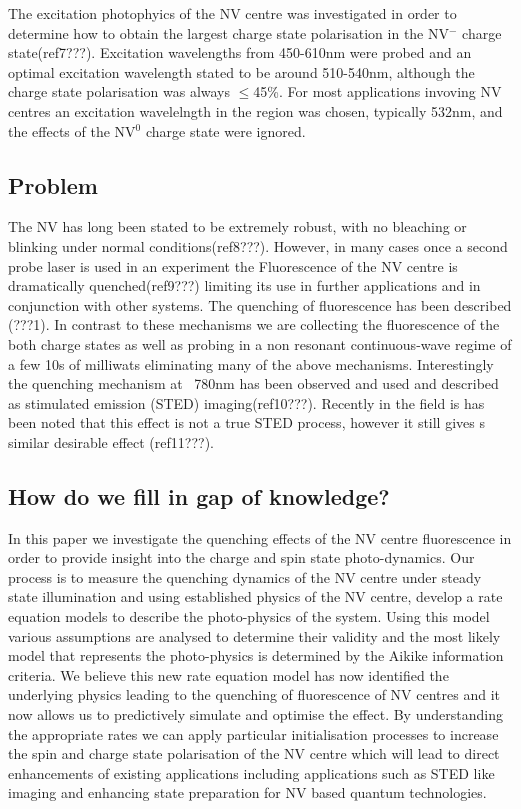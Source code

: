 \documentclass[preprint,prl]{revtex4}
\begin{document}
The excitation photophyics of the NV centre was investigated in order to determine how to obtain the largest charge state polarisation in the NV$^-$ charge state(ref7???). Excitation wavelengths from 450-610nm were probed and an optimal excitation wavelength stated to be around 510-540nm, although the charge state polarisation was always $\leq$45\%. For most applications invoving NV centres an excitation wavelelngth in the region was chosen, typically 532nm, and the effects of the NV$^0$ charge state were ignored.

\subsection{Problem}

The NV has long been stated to be extremely robust, with no bleaching or blinking under normal conditions(ref8???). However, in many cases once a second probe laser is used in an experiment the Fluorescence of the NV centre is dramatically quenched(ref9???) limiting its use in further applications and in conjunction with other systems. The quenching of fluorescence has been described (???1). In contrast to these mechanisms we are collecting the fluorescence of the both charge states as well as probing in a non resonant continuous-wave regime of a few 10s of milliwats eliminating many of the above mechanisms. Interestingly the quenching mechanism at ~780nm has been observed and used and described as stimulated emission (STED) imaging(ref10???). Recently in the field is has been noted that this effect is not a true STED process, however it still gives s similar desirable effect (ref11???).  

\subsection{How do we fill in gap of knowledge?}

In this paper we investigate the quenching effects of the NV centre fluorescence in order to provide insight into the charge and spin state photo-dynamics. Our process is to measure the quenching dynamics of the NV centre under steady state illumination and using established physics of the NV centre, develop a rate equation models to describe the photo-physics of the system. Using this model various assumptions are analysed to determine their validity and the most likely model that represents the photo-physics is determined by the Aikike information criteria. We believe this new rate equation model has now identified the underlying physics leading to the quenching of fluorescence of NV centres and it now allows us to predictively simulate and optimise the effect. By understanding the appropriate rates we can apply particular initialisation processes to increase the spin and charge state polarisation of the NV centre which will lead to direct enhancements of existing applications including applications such as STED like imaging and enhancing state preparation for NV based quantum technologies.
\end{document}
